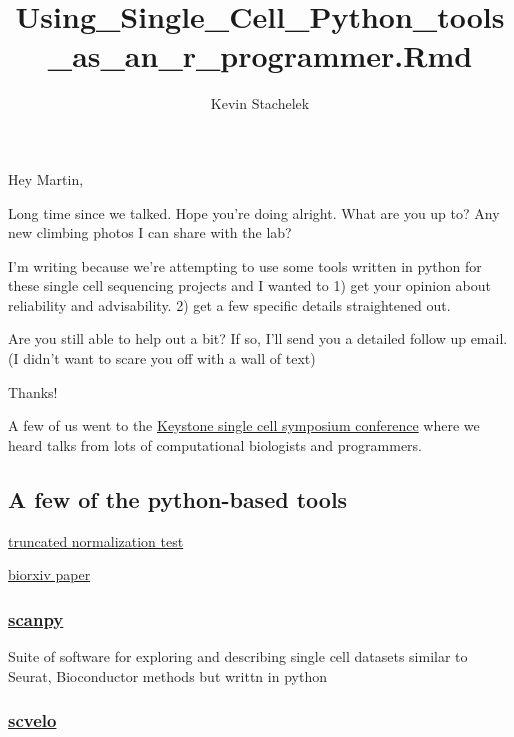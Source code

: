 \documentclass[]{article}
\title{Using\_Single\_Cell\_Python\_tools\_as\_an\_r\_programmer.Rmd}
\author{Kevin Stachelek}
\date{}
\begin{document}
\maketitle

Hey Martin,

Long time since we talked. Hope you're doing alright. What are you up
to? Any new climbing photos I can share with the lab?

I'm writing because we're attempting to use some tools written in python
for these single cell sequencing projects and I wanted to 1) get your
opinion about reliability and advisability. 2) get a few specific
details straightened out.

Are you still able to help out a bit? If so, I'll send you a detailed
follow up email. (I didn't want to scare you off with a wall of text)

Thanks!

A few of us went to the
\href{https://www.keystonesymposia.org/index.cfm?e=web.Meeting.Program\&meetingid=1610}{Keystone
single cell symposium conference} where we heard talks from lots of
computational biologists and programmers.

\hypertarget{a-few-of-the-python-based-tools}{%
\subsection{A few of the python-based
tools}\label{a-few-of-the-python-based-tools}}

\href{https://github.com/jessemzhang/tn_test}{truncated normalization
test}

\href{https://www.biorxiv.org/content/10.1101/463265v1}{biorxiv paper}

\hypertarget{scanpy}{%
\subsubsection{\texorpdfstring{\href{https://github.com/theislab/scanpy}{scanpy}}{scanpy}}\label{scanpy}}

Suite of software for exploring and describing single cell datasets
similar to Seurat, Bioconductor methods but writtn in python

\hypertarget{scvelo}{%
\subsubsection{\texorpdfstring{\href{https://github.com/theislab/scvelo}{scvelo}}{scvelo}}\label{scvelo}}
\end{document}
